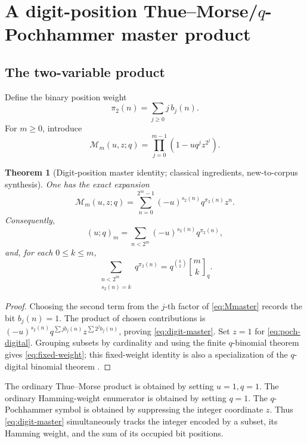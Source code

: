 \documentclass[11pt,oneside]{article}
\newtheorem{theorem}{Theorem}[section]
\theoremstyle{definition}
\theoremstyle{remark}
\newcommand{\qbinom}[3]{\genfrac{[}{]}{0pt}{}{#1}{#2}_{#3}}
\begin{document}
\section{A digit-position Thue--Morse/\texorpdfstring{\(q\)}{q}-Pochhammer master product}

\subsection{The two-variable product}
Define the binary position weight
\begin{equation}\label{eq:pi2}
 \pi_2(n)=\sum_{j\ge0}j\,b_j(n).
\end{equation}
For \(m\ge0\), introduce
\begin{equation}\label{eq:Mmaster}
 \mathcal M_m(u,z;q)=\prod_{j=0}^{m-1}(1-uq^jz^{2^j}).
\end{equation}

\begin{theorem}[Digit-position master identity; classical ingredients,
new-to-corpus synthesis]\label{thm:digit-master}
One has the exact expansion
\begin{equation}\label{eq:digit-master}
 \mathcal M_m(u,z;q)
 =\sum_{n=0}^{2^m-1}(-u)^{s_2(n)}q^{\pi_2(n)}z^n.
\end{equation}
Consequently,
\begin{equation}\label{eq:poch-digital}
 (u;q)_m=\sum_{n<2^m}(-u)^{s_2(n)}q^{\pi_2(n)},
\end{equation}
and, for each \(0\le k\le m\),
\begin{equation}\label{eq:fixed-weight}
 \sum_{\substack{n<2^m\\s_2(n)=k}}q^{\pi_2(n)}
 =q^{\binom k2}\qbinom{m}{k}{q}.
\end{equation}
\end{theorem}

\begin{proof}
Choosing the second term from the \(j\)-th factor of
\eqref{eq:Mmaster} records the bit \(b_j(n)=1\).  The product of chosen
contributions is
\((-u)^{s_2(n)}q^{\sum jb_j(n)}z^{\sum2^jb_j(n)}\), proving
\eqref{eq:digit-master}.  Set \(z=1\) for \eqref{eq:poch-digital}.  Grouping
subsets by cardinality and using the finite \(q\)-binomial theorem gives
\eqref{eq:fixed-weight}; this fixed-weight identity is also a specialization of
the \(q\)-digital binomial theorem \cite{mansour-nguyen}.
\end{proof}

The ordinary Thue--Morse product is obtained by setting \(u=1,q=1\).  The
ordinary Hamming-weight enumerator is obtained by setting \(q=1\).  The
\(q\)-Pochhammer symbol is obtained by suppressing the integer coordinate
\(z\).  Thus \eqref{eq:digit-master} simultaneously tracks the integer encoded
by a subset, its Hamming weight, and the sum of its occupied bit positions.
\end{document}
